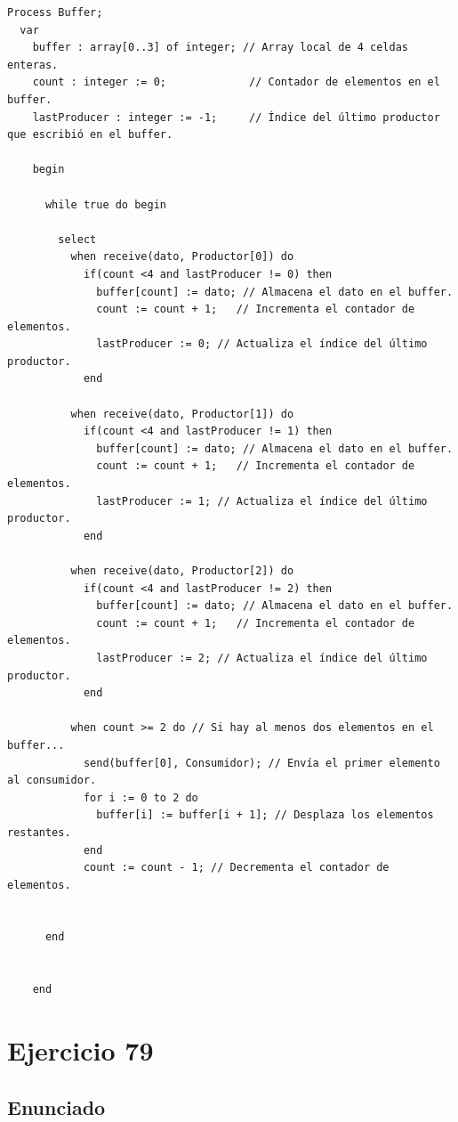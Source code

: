 \documentclass[a4paper,12pt]{article}
\begin{document}
\begin{lstlisting}[style=customcpp, caption={Pseudocódigo del proceso Buffer}]
  Process Buffer;
  var
    buffer : array[0..3] of integer; // Array local de 4 celdas enteras.
    count : integer := 0;             // Contador de elementos en el buffer.
    lastProducer : integer := -1;     // Índice del último productor que escribió en el buffer.

    begin
    
      while true do begin

        select
          when receive(dato, Productor[0]) do 
            if(count <4 and lastProducer != 0) then
              buffer[count] := dato; // Almacena el dato en el buffer.
              count := count + 1;   // Incrementa el contador de elementos.
              lastProducer := 0; // Actualiza el índice del último productor.
            end
          
          when receive(dato, Productor[1]) do
            if(count <4 and lastProducer != 1) then
              buffer[count] := dato; // Almacena el dato en el buffer.
              count := count + 1;   // Incrementa el contador de elementos.
              lastProducer := 1; // Actualiza el índice del último productor.
            end
          
          when receive(dato, Productor[2]) do
            if(count <4 and lastProducer != 2) then
              buffer[count] := dato; // Almacena el dato en el buffer.
              count := count + 1;   // Incrementa el contador de elementos.
              lastProducer := 2; // Actualiza el índice del último productor.
            end
          
          when count >= 2 do // Si hay al menos dos elementos en el buffer...
            send(buffer[0], Consumidor); // Envía el primer elemento al consumidor.
            for i := 0 to 2 do
              buffer[i] := buffer[i + 1]; // Desplaza los elementos restantes.
            end
            count := count - 1; // Decrementa el contador de elementos.
              

      end
    
    
    end
\end{lstlisting}

\section{Ejercicio 79}

\subsection{Enunciado}
\end{document}
